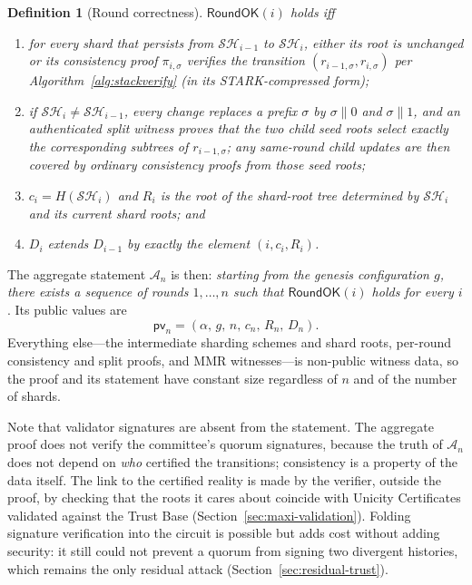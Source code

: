 \documentclass[11pt]{article}
\newtheorem{definition}{Definition}
\begin{document}
\begin{definition}[Round correctness]
\label{def:roundok}
$\mathsf{RoundOK}(i)$ holds iff
\begin{enumerate}[nosep]
  \item for every shard that persists from $\mathcal{SH}_{i-1}$ to $\mathcal{SH}_i$, either its root is unchanged or its consistency proof $\pi_{i,\sigma}$ verifies the transition $(r_{i-1,\sigma},r_{i,\sigma})$ per Algorithm~\ref{alg:stackverify} (in its STARK-compressed form);
  \item if $\mathcal{SH}_i\ne\mathcal{SH}_{i-1}$, every change replaces a prefix $\sigma$ by $\sigma\|0$ and $\sigma\|1$, and an authenticated split witness proves that the two child seed roots select exactly the corresponding subtrees of $r_{i-1,\sigma}$; any same-round child updates are then covered by ordinary consistency proofs from those seed roots;
  \item $c_i=H(\mathcal{SH}_i)$ and $R_i$ is the root of the shard-root tree determined by $\mathcal{SH}_i$ and its current shard roots; and
  \item $D_i$ extends $D_{i-1}$ by exactly the element $(i,c_i,R_i)$.
\end{enumerate}
\end{definition}

The aggregate statement $\mathcal{A}_n$ is then: \emph{starting from the genesis configuration $g$, there exists a sequence of rounds $1, \ldots, n$ such that $\mathsf{RoundOK}(i)$ holds for every $i$}. Its public values are
\[ \mathsf{pv}_n = (\alpha,\, g,\, n,\, c_n,\, R_n,\, D_n). \]
Everything else---the intermediate sharding schemes and shard roots, per-round consistency and split proofs, and MMR witnesses---is non-public witness data, so the proof and its statement have constant size regardless of $n$ and of the number of shards.

Note that validator signatures are absent from the statement. The aggregate proof does not verify the committee's quorum signatures, because the truth of $\mathcal{A}_n$ does not depend on \emph{who} certified the transitions; consistency is a property of the data itself. The link to the certified reality is made by the verifier, outside the proof, by checking that the roots it cares about coincide with Unicity Certificates validated against the Trust Base (Section~\ref{sec:maxi-validation}). Folding signature verification into the circuit is possible but adds cost without adding security: it still could not prevent a quorum from signing two divergent histories, which remains the only residual attack (Section~\ref{sec:residual-trust}).
\end{document}
